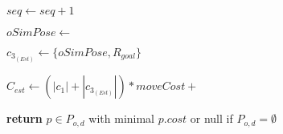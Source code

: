 \begin{algorithm}[H]
\begin{algorithmic}[1]
          \State $seq \gets seq + 1$

          \State {}

          \State {}

          \State $oSimPose \gets $

          \State $c_{3_{(Est)}} \gets \{oSimPose, R_{goal}\}$

          \State $C_{est} \gets (|c_{1}| + |c_{3_{(Est)}}|) * moveCost + $

        \EndWhile

      \EndFor

    \State \textbf{return} $p \in P_{o,d}$ with minimal $p.cost$ or null if $P_{o,d} = \emptyset$

    \EndProcedure

  \end{algorithmic}
\end{algorithm}
